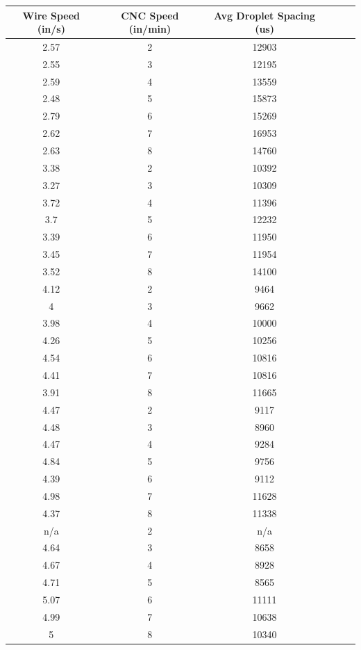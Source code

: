 \documentclass[12pt]{article}
\begin{document}
\clearpage

\begin{center}

\begin{tabular}{ |c|c|c|c|c|c| }


  \hline
  \textbf{Wire Speed (in/s)} & \textbf{CNC Speed (in/min)} & \textbf{Avg Droplet Spacing (us)} \\ \hline
  
2.57 &	2 &	12903 \\ \hline
2.55 &	3 &	12195 \\ \hline
2.59 &	4 &	13559 \\ \hline
2.48 &	5 &	15873 \\ \hline
2.79 &	6 &	15269 \\ \hline
2.62 &	7 &	16953 \\ \hline
2.63 &	8 &	14760 \\ \hline \hline
3.38 &	2 &	10392 \\ \hline
3.27 &	3 &	10309 \\ \hline
3.72 &	4 &	11396 \\ \hline
3.7 &	5 &	12232 \\ \hline
3.39 &	6 &	11950 \\ \hline
3.45 &	7 &	11954 \\ \hline
3.52 &	8 &	14100 \\ \hline \hline
4.12 &	2 &	9464 \\ \hline
4 &	3 &	9662 \\ \hline
3.98 &	4 &	10000 \\ \hline
4.26 &	5 &	10256 \\ \hline
4.54 &	6 &	10816 \\ \hline
4.41 &	7 &	10816 \\ \hline
3.91 &	8 &	11665 \\ \hline \hline
4.47 &	2 &	9117 \\ \hline
4.48 &	3 &	8960 \\ \hline
4.47 &	4 &	9284 \\ \hline
4.84 &	5 &	9756 \\ \hline
4.39 &	6 &	9112 \\ \hline
4.98 &	7 &	11628 \\ \hline
4.37 &	8 &	11338 \\ \hline \hline
n/a &	2 &	n/a \\ \hline
4.64 &	3 &	8658 \\ \hline
4.67 &	4 &	8928 \\ \hline
4.71 &	5 &	8565 \\ \hline
5.07 &	6 &	11111 \\ \hline
4.99 &	7 &	10638 \\ \hline
5 &	8 &	10340 \\ \hline	




 
\end{tabular}


\end{center}
\end{document}
